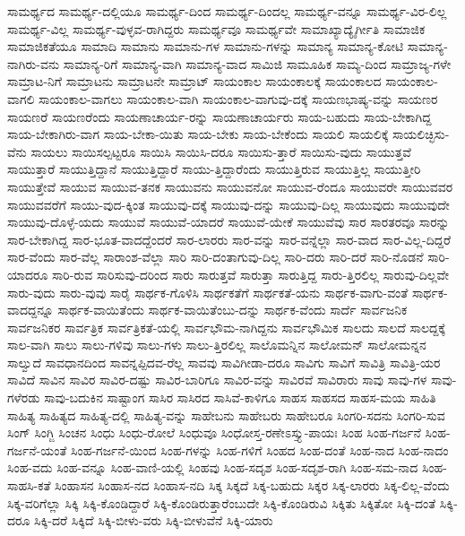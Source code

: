 {ಸಾಮರ್ಥ್ಯದ
ಸಾಮರ್ಥ್ಯ-ದಲ್ಲಿಯೂ
ಸಾಮರ್ಥ್ಯ-ದಿಂದ
ಸಾಮರ್ಥ್ಯ-ದಿಂದಲ್ಲ
ಸಾಮರ್ಥ್ಯ-ವನ್ನೂ
ಸಾಮರ್ಥ್ಯ-ವಿರ-ಲಿಲ್ಲ
ಸಾಮರ್ಥ್ಯ-ವಿಲ್ಲ
ಸಾಮರ್ಥ್ಯ-ವುಳ್ಳವ-ರಾಗಿದ್ದರು
ಸಾಮರ್ಥ್ಯವೂ
ಸಾಮರ್ಥ್ಯವೇ
ಸಾಮಾಖ್ಯಾದ್ಯೈರ್ಗೀತಿ
ಸಾಮಾಜಿಕ
ಸಾಮಾಜಿಕತೆಯೂ
ಸಾಮಾದಿ
ಸಾಮಾನು
ಸಾಮಾನು-ಗಳ
ಸಾಮಾನು-ಗಳನ್ನು
ಸಾಮಾನ್ಯ
ಸಾಮಾನ್ಯ-ಕೋಟಿ
ಸಾಮಾನ್ಯ-ನಾಗಿರು-ವನು
ಸಾಮಾನ್ಯ-ರಿಗೆ
ಸಾಮಾನ್ಯ-ವಾಗಿ
ಸಾಮಾನ್ಯ-ವಾದ
ಸಾಮಿಜಿ
ಸಾಮೂಹಿಕ
ಸಾಮ್ಯ-ದಿಂದ
ಸಾಮ್ರಾಜ್ಯ-ಗಳೇ
ಸಾಮ್ರಾಟ-ನಿಗೆ
ಸಾಮ್ರಾಟನು
ಸಾಮ್ರಾಟನೇ
ಸಾಮ್ರಾಟ್
ಸಾಯಂಕಾಲ
ಸಾಯಂಕಾಲಕ್ಕೆ
ಸಾಯಂಕಾಲದ
ಸಾಯಂಕಾಲ-ವಾಗಲಿ
ಸಾಯಂಕಾಲ-ವಾಗಲು
ಸಾಯಂಕಾಲ-ವಾಗಿ
ಸಾಯಂಕಾಲ-ವಾಗುವು-ದಕ್ಕೆ
ಸಾಯಣಭಾಷ್ಯ-ವನ್ನು
ಸಾಯಣರ
ಸಾಯಣರೆ
ಸಾಯಣರೆಂದು
ಸಾಯಣಾಚಾರ್ಯ-ರನ್ನು
ಸಾಯಣಾಚಾರ್ಯರು
ಸಾಯ-ಬಹುದು
ಸಾಯ-ಬೇಕಾಗಿದ್ದ
ಸಾಯ-ಬೇಕಾಗಿರು-ವಾಗ
ಸಾಯ-ಬೇಕಾ-ಯಿತು
ಸಾಯ-ಬೇಕು
ಸಾಯ-ಬೇಕೆಂದು
ಸಾಯಲಿ
ಸಾಯಲಿಕ್ಕೆ
ಸಾಯಲಿಚ್ಛಿಸು-ವೆನು
ಸಾಯಲು
ಸಾಯಿಸಲ್ಪಟ್ಟರೂ
ಸಾಯಿಸಿ
ಸಾಯಿಸಿ-ದರೂ
ಸಾಯಿಸು-ತ್ತಾರೆ
ಸಾಯಿಸು-ವುದು
ಸಾಯುತ್ತವೆ
ಸಾಯುತ್ತಾರೆ
ಸಾಯುತ್ತಿದ್ದಾನೆ
ಸಾಯುತ್ತಿದ್ದಾರೆ
ಸಾಯು-ತ್ತಿದ್ದಾರೆಂದು
ಸಾಯುತ್ತಿರುವ
ಸಾಯುತ್ತಿಲ್ಲ
ಸಾಯುತ್ತೀರಿ
ಸಾಯುತ್ತೇವೆ
ಸಾಯುವ
ಸಾಯುವ-ತನಕ
ಸಾಯುವನು
ಸಾಯುವನೋ
ಸಾಯುವ-ರೆಂದೂ
ಸಾಯುವರೇ
ಸಾಯುವವರ
ಸಾಯುವವರೆಗೆ
ಸಾಯು-ವುದ-ಕ್ಕಿಂತ
ಸಾಯುವು-ದಕ್ಕೆ
ಸಾಯುವು-ದನ್ನು
ಸಾಯುವು-ದಿಲ್ಲ
ಸಾಯುವುದು
ಸಾಯುವುದೇ
ಸಾಯುವು-ದೊಳ್ಳೆ-ಯದು
ಸಾಯುವೆ
ಸಾಯುವೆ-ಯಾದರೆ
ಸಾಯುವೆ-ಯೇಕೆ
ಸಾಯುವೆವು
ಸಾರ
ಸಾರತರವೂ
ಸಾರನ್ನು
ಸಾರ-ಬೇಕಾಗಿದ್ದ
ಸಾರ-ಭೂತ-ವಾದದ್ದೆಂದರೆ
ಸಾರ-ಲಾರರು
ಸಾರ-ವನ್ನು
ಸಾರ-ವನ್ನೆಲ್ಲಾ
ಸಾರ-ವಾದ
ಸಾರ-ವಿಲ್ಲ-ದಿದ್ದರೆ
ಸಾರ-ವೆಂದು
ಸಾರ-ವೆಲ್ಲ
ಸಾರಾಂಶ-ವೆಲ್ಲಾ
ಸಾರಿ
ಸಾರಿ-ದಂತಾಗುವು-ದಿಲ್ಲ
ಸಾರಿ-ದರು
ಸಾರಿ-ದರೆ
ಸಾರಿ-ನೊಡನೆ
ಸಾರಿ-ಯಾದರೂ
ಸಾರಿ-ರುವ
ಸಾರಿಸುವು-ದರಿಂದ
ಸಾರು
ಸಾರುತ್ತವೆ
ಸಾರುತ್ತಾ
ಸಾರುತ್ತಿದ್ದ
ಸಾರು-ತ್ತಿರಲಿಲ್ಲ
ಸಾರುವು-ದಿಲ್ಲವೇ
ಸಾರು-ವುದು
ಸಾರು-ವುವು
ಸಾರೈ
ಸಾರ್ಥಕ-ಗೊಳಿಸಿ
ಸಾರ್ಥಕತೆಗೆ
ಸಾರ್ಥಕತೆ-ಯನು
ಸಾರ್ಥಕ-ವಾಗು-ವಂತೆ
ಸಾರ್ಥಕ-ವಾದದ್ದನ್ನೂ
ಸಾರ್ಥಕ-ವಾಯಿತೆಂದು
ಸಾರ್ಥಕ-ವಾಯಿತೆಂಬು-ದನ್ನು
ಸಾರ್ಥಕ-ವೆಂದು
ಸಾರ್ದೆ
ಸಾರ್ವಜನಿಕ
ಸಾರ್ವಜನಿಕರ
ಸಾರ್ವತ್ರಿಕ
ಸಾರ್ವತ್ರಿಕತೆ-ಯಲ್ಲಿ
ಸಾರ್ವಭೌಮ-ನಾಗಿದ್ದನು
ಸಾರ್ವಭೌಮಿಕ
ಸಾಲದು
ಸಾಲದೆ
ಸಾಲದ್ದಕ್ಕೆ
ಸಾಲ-ವಾಗಿ
ಸಾಲು
ಸಾಲು-ಗಳಿವು
ಸಾಲು-ಗಳು
ಸಾಲು-ತ್ತಿರಲಿಲ್ಲ
ಸಾಲೊಮನ್ನಿನ
ಸಾಲೋಮನ್
ಸಾಲೋಮನ್ನನ
ಸಾಲ್ವುದೆ
ಸಾವಧಾನದಿಂದ
ಸಾವನ್ನಪ್ಪಿದವ-ರೆಲ್ಲ
ಸಾವವು
ಸಾವಿಗೀಡಾ-ದರೂ
ಸಾವಿಗು
ಸಾವಿಗೆ
ಸಾವಿತ್ರಿ
ಸಾವಿತ್ರಿ-ಯರ
ಸಾವಿದೆ
ಸಾವಿನ
ಸಾವಿರ
ಸಾವಿರ-ದಷ್ಟು
ಸಾವಿರ-ಬಾರಿಗೂ
ಸಾವಿರ-ವನ್ನು
ಸಾವಿರವೆ
ಸಾವಿರಾರು
ಸಾವು
ಸಾವು-ಗಳ
ಸಾವು-ಗಳೆರಡು
ಸಾವು-ಬದುಕಿನ
ಸಾಷ್ಟಾಂಗ
ಸಾಸಿರ
ಸಾಸಿರದ
ಸಾಸಿವೆ-ಕಾಳಿಗೂ
ಸಾಹಸ
ಸಾಹಸದ
ಸಾಹಸ-ಮಯ
ಸಾಹಿತಿ
ಸಾಹಿತ್ಯ
ಸಾಹಿತ್ಯದ
ಸಾಹಿತ್ಯ-ದಲ್ಲಿ
ಸಾಹಿತ್ಯ-ವನ್ನು
ಸಾಹೇಬನು
ಸಾಹೇಬರು
ಸಾಹೇಬರೂ
ಸಿಂಗರಿ-ಸದನು
ಸಿಂಗರಿ-ಸುವ
ಸಿಂಗ್
ಸಿಂಗ್ಜಿ
ಸಿಂಚನ
ಸಿಂಧು
ಸಿಂಧು-ರೋಲೆ
ಸಿಂಧುವೂ
ಸಿಂಧೋಸ್ತ-ರಣೇಽಸ್ತ್ಯು-ಪಾಯಃ
ಸಿಂಹ
ಸಿಂಹ-ಗರ್ಜನೆ
ಸಿಂಹ-ಗರ್ಜನೆ-ಯಂತೆ
ಸಿಂಹ-ಗರ್ಜನೆ-ಯಿಂದ
ಸಿಂಹ-ಗಳನ್ನು
ಸಿಂಹ-ಗಳಿಗೆ
ಸಿಂಹದ
ಸಿಂಹ-ದಂತೆ
ಸಿಂಹ-ನಾದ
ಸಿಂಹ-ನಾದಂ
ಸಿಂಹ-ವದು
ಸಿಂಹ-ವನ್ನೂ
ಸಿಂಹ-ವಾಣಿ-ಯಲ್ಲಿ
ಸಿಂಹವು
ಸಿಂಹ-ಸದೃಶ
ಸಿಂಹ-ಸದೃಶ-ರಾಗಿ
ಸಿಂಹ-ಸಮ-ನಾದ
ಸಿಂಹ-ಸಾಹಸಿ-ಕತೆ
ಸಿಂಹಾಸನ
ಸಿಂಹಾಸ-ನದ
ಸಿಂಹಾಸ-ನದಿ
ಸಿಕ್ಕ
ಸಿಕ್ಕದೆ
ಸಿಕ್ಕ-ಬಹುದು
ಸಿಕ್ಕರ
ಸಿಕ್ಕ-ಲಾರರು
ಸಿಕ್ಕ-ಲಿಲ್ಲ-ವೆಂದು
ಸಿಕ್ಕ-ವರಿಗೆಲ್ಲಾ
ಸಿಕ್ಕಿ
ಸಿಕ್ಕಿ-ಕೊಂಡಿದ್ದಾರೆ
ಸಿಕ್ಕಿ-ಕೊಂಡಿರುತ್ತಾರೆಂಬುದೇ
ಸಿಕ್ಕಿ-ಕೊಂಡಿರುವಿ
ಸಿಕ್ಕಿತು
ಸಿಕ್ಕಿತೋ
ಸಿಕ್ಕಿ-ದಂತೆ
ಸಿಕ್ಕಿ-ದರೂ
ಸಿಕ್ಕಿ-ದರೆ
ಸಿಕ್ಕಿದೆ
ಸಿಕ್ಕಿ-ಬೀಳು-ವರು
ಸಿಕ್ಕಿ-ಬೀಳುವೆನೆ
ಸಿಕ್ಕಿ-ಯಾರು
}
